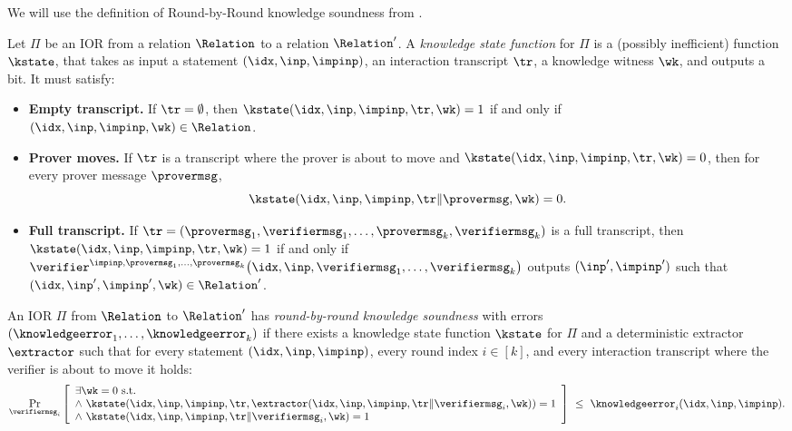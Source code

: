 We will use the definition of Round-by-Round knowledge soundness from \cite{BCFW25}.
\begin{definition}
\label{def:knowledge-state-function}
Let $\Pi$ be an IOR from a relation $\Relation$ to a relation $\Relation'$.
A \emph{knowledge state function} for $\Pi$ is a (possibly inefficient) function $\kstate$, that takes as input a statement $(\idx,\inp,\impinp)$, an interaction transcript $\tr$, a knowledge witness $\wk$, and outputs a bit. It must satisfy:
\begin{itemize}[nosep]
  \item \textbf{Empty transcript.} If $\tr=\emptyset$, then $\kstate(\idx,\inp,\impinp,\tr, \wk)=1$ if and only if $(\idx,\inp,\impinp,\wk)\in \Relation$.
  \item \textbf{Prover moves.} If $\tr$ is a transcript where the prover is about to move and $\kstate(\idx,\inp,\impinp,\tr, \wk)=0$, then for every prover message $\provermsg$,
  \[
    \kstate(\idx,\inp,\impinp,\tr\Vert \provermsg, \wk)=0.
  \]
  \item \textbf{Full transcript.} If $\tr=(\provermsg_1,\verifiermsg_1,\dots,\provermsg_k,\verifiermsg_k)$ is a full transcript, then $\kstate(\idx,\inp,\impinp,\tr, \wk)=1$ if and only if $\verifier^{\impinp,\provermsg_1,\dots,\provermsg_k}\bigl(\idx,\inp,\verifiermsg_1,\dots,\verifiermsg_k\bigr)$ outputs $(\inp',\impinp')$ such that $(\idx,\inp',\impinp',\wk)\in \Relation'$.
\end{itemize}
\end{definition}

\begin{definition}
\label{def:rbr-knowledge-new}
An IOR $\Pi$ from $\Relation$ to $\Relation'$ has \emph{round-by-round knowledge soundness} with errors $(\knowledgeerror_1,\dots,\knowledgeerror_k)$
if there exists a knowledge state function $\kstate$ for $\Pi$ and a deterministic extractor $\extractor$ such that for every statement $(\idx,\inp,\impinp)$, every round index $i\in[k]$, and every interaction transcript where the verifier is about to move it holds:
\[
  \Pr_{\verifiermsg_i}\left[
    \begin{array}{l}
    \exists \wk=0 \text{ s.t. }\\
    \wedge\ \kstate(\idx,\inp,\impinp,\tr, \extractor(\idx,\inp,\impinp,\tr\Vert\verifiermsg_i, \wk))=1 \\
    \wedge\ \kstate(\idx,\inp,\impinp,\tr\Vert\verifiermsg_i, \wk)=1 \\
    \end{array}
  \right]
  \ \le\ \knowledgeerror_i(\idx,\inp,\impinp).
\]
\end{definition}

